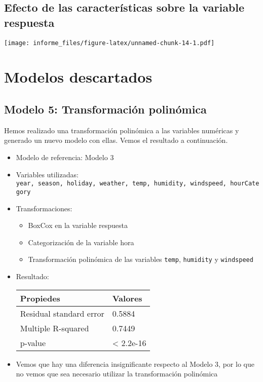 \documentclass[
]{article}
\providecommand{\tightlist}{%
  \setlength{\itemsep}{0pt}\setlength{\parskip}{0pt}}
\begin{document}
\hypertarget{efecto-de-las-caracteruxedsticas-sobre-la-variable-respuesta}{%
\subsection{Efecto de las características sobre la variable
respuesta}\label{efecto-de-las-caracteruxedsticas-sobre-la-variable-respuesta}}

\texttt{[image: informe\_files/figure-latex/unnamed-chunk-14-1.pdf]}

\hypertarget{modelos-descartados}{%
\section{Modelos descartados}\label{modelos-descartados}}

\hypertarget{modelo-5-transformaciuxf3n-polinuxf3mica}{%
\subsection{Modelo 5: Transformación
polinómica}\label{modelo-5-transformaciuxf3n-polinuxf3mica}}

Hemos realizado una transformación polinómica a las variables numéricas
y generado un nuevo modelo con ellas. Vemos el resultado a continuación.

\begin{itemize}
\item
  Modelo de referencia: Modelo 3
\item
  Variables utilizadas:
  \texttt{year,\ season,\ holiday,\ weather,\ temp,\ humidity,\ windspeed,\ hourCategory}
\item
  Transformaciones:

  \begin{itemize}
  \tightlist
  \item
    BoxCox en la variable respuesta
  \item
    Categorización de la variable hora
  \item
    Transformación polinómica de las variables \texttt{temp},
    \texttt{humidity} y \texttt{windspeed}
  \end{itemize}
\item
  Resultado:

  \begin{longtable}[]{@{}ll@{}}
  \toprule
  Propiedes & Valores\tabularnewline
  \midrule
  \endhead
  Residual standard error & 0.5884\tabularnewline
  Multiple R-squared & 0.7449\tabularnewline
  p-value & \textless{} 2.2e-16\tabularnewline
  \bottomrule
  \end{longtable}
\item
  Vemos que hay una diferencia insignificante respecto al Modelo 3, por
  lo que no vemos que sea necesario utilizar la transformación
  polinómica
\end{itemize}
\end{document}

